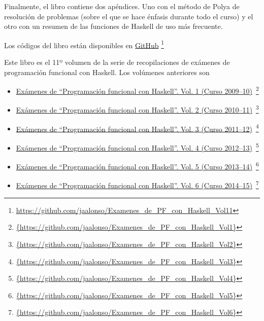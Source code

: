 \documentclass[a4paper,12pt,twoside]{book}
\begin{document}
Finalmente, el libro contiene dos apéndices. Uno con el método de Polya
de resolución de problemas (sobre el que se hace énfasis durante todo el
curso) y el otro con un resumen de las funciones de Haskell de uso más
frecuente.

Los códigos del libro están disponibles en
\href{https://github.com/jaalonso/Examenes_de_PF_con_Haskell_Vol11}
     {GitHub}
     \footnote{{\url{https://github.com/jaalonso/Examenes_de_PF_con_Haskell_Vol11}}}

Este libro es el 11º volumen de la serie de recopilaciones de
exámenes de programación funcional con Haskell. Los volúmenes anteriores son
\begin{itemize}
\item
  \href{https://github.com/jaalonso/Examenes_de_PF_con_Haskell_Vol1}
  {Exámenes de ``Programaci\'on funcional con Haskell''.
    Vol. 1 (Curso 2009--10)}\
    \footnote{\url{{https://github.com/jaalonso/Examenes_de_PF_con_Haskell_Vol1}}}

\item
  \href{https://github.com/jaalonso/Examenes_de_PF_con_Haskell_Vol2}
  {Exámenes de ``Programaci\'on funcional con Haskell''.
    Vol. 2 (Curso 2010--11)}\
    \footnote{\url{{https://github.com/jaalonso/Examenes_de_PF_con_Haskell_Vol2}}}

\item
  \href{https://github.com/jaalonso/Examenes_de_PF_con_Haskell_Vol3}
  {Exámenes de ``Programaci\'on funcional con Haskell''.
    Vol. 3 (Curso 2011--12)}\
    \footnote{\url{{https://github.com/jaalonso/Examenes_de_PF_con_Haskell_Vol3}}}

\item
  \href{https://github.com/jaalonso/Examenes_de_PF_con_Haskell_Vol4}
  {Exámenes de ``Programaci\'on funcional con Haskell''.
    Vol. 4 (Curso 2012--13)}\
    \footnote{\url{{https://github.com/jaalonso/Examenes_de_PF_con_Haskell_Vol4}}}

\item
  \href{https://github.com/jaalonso/Examenes_de_PF_con_Haskell_Vol5}
  {Exámenes de ``Programaci\'on funcional con Haskell''.
    Vol. 5 (Curso 2013--14)}\
    \footnote{\url{{https://github.com/jaalonso/Examenes_de_PF_con_Haskell_Vol5}}}

\item
  \href{https://github.com/jaalonso/Examenes_de_PF_con_Haskell_Vol6}
  {Exámenes de ``Programaci\'on funcional con Haskell''.
    Vol. 6 (Curso 2014--15)}\
    \footnote{\url{{https://github.com/jaalonso/Examenes_de_PF_con_Haskell_Vol6}}}


\end{itemize}
\end{document}
